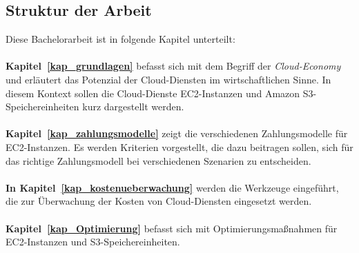 \subsection{Struktur der Arbeit}


Diese Bachelorarbeit ist in folgende Kapitel unterteilt:\\\\
\textbf{Kapitel~\ref{kap_grundlagen}} 
befasst sich mit dem Begriff der \textit{Cloud-Economy} und erläutert das Potenzial der Cloud-Diensten im wirtschaftlichen Sinne. In diesem Kontext sollen die Cloud-Dienste EC2-Instanzen und Amazon S3-Speichereinheiten kurz dargestellt werden. 
\\\\
\textbf{Kapitel~\ref{kap_zahlungsmodelle}} 
zeigt die verschiedenen Zahlungsmodelle für EC2-Instanzen. Es werden Kriterien vorgestellt, die dazu beitragen sollen, sich für das richtige Zahlungsmodell bei verschiedenen Szenarien zu entscheiden. 
\\\\
\textbf{In Kapitel~\ref{kap_kostenueberwachung}} werden die Werkzeuge eingeführt, die zur Überwachung der Kosten von Cloud-Diensten eingesetzt werden.
\\\\
\textbf{Kapitel~\ref{kap_Optimierung}} befasst sich mit Optimierungsmaßnahmen %
für EC2-Instanzen und S3-Speichereinheiten.

 
